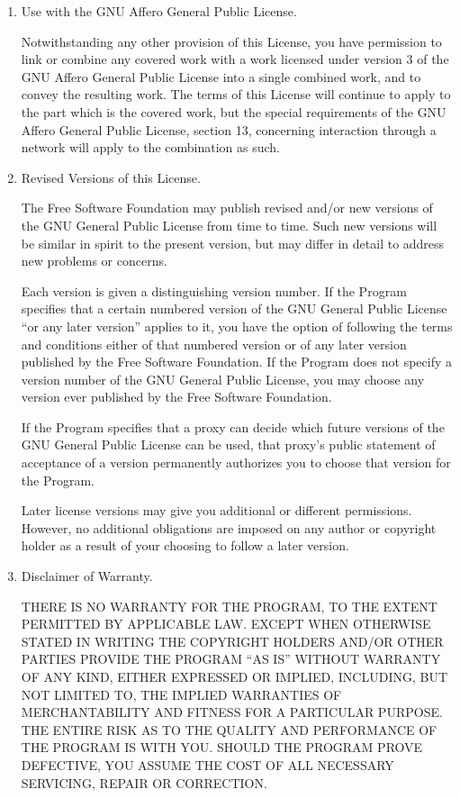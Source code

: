 \documentclass[11pt]{article}
\begin{document}
\begin{enumerate}
  \item Use with the GNU Affero General Public License.

        Notwithstanding any other provision of this License, you have
        permission to link or combine any covered work with a work licensed
        under version 3 of the GNU Affero General Public License into a single
        combined work, and to convey the resulting work.  The terms of this
        License will continue to apply to the part which is the covered work,
        but the special requirements of the GNU Affero General Public License,
        section 13, concerning interaction through a network will apply to the
        combination as such.

  \item Revised Versions of this License.

        The Free Software Foundation may publish revised and/or new versions of
        the GNU General Public License from time to time.  Such new versions will
        be similar in spirit to the present version, but may differ in detail to
        address new problems or concerns.

        Each version is given a distinguishing version number.  If the
        Program specifies that a certain numbered version of the GNU General
        Public License ``or any later version'' applies to it, you have the
        option of following the terms and conditions either of that numbered
        version or of any later version published by the Free Software
        Foundation.  If the Program does not specify a version number of the
        GNU General Public License, you may choose any version ever published
        by the Free Software Foundation.

        If the Program specifies that a proxy can decide which future
        versions of the GNU General Public License can be used, that proxy's
        public statement of acceptance of a version permanently authorizes you
        to choose that version for the Program.

        Later license versions may give you additional or different
        permissions.  However, no additional obligations are imposed on any
        author or copyright holder as a result of your choosing to follow a
        later version.

  \item Disclaimer of Warranty.

        \begin{sloppypar}
          THERE IS NO WARRANTY FOR THE PROGRAM, TO THE EXTENT PERMITTED BY
          APPLICABLE LAW.  EXCEPT WHEN OTHERWISE STATED IN WRITING THE
          COPYRIGHT HOLDERS AND/OR OTHER PARTIES PROVIDE THE PROGRAM ``AS IS''
          WITHOUT WARRANTY OF ANY KIND, EITHER EXPRESSED OR IMPLIED,
          INCLUDING, BUT NOT LIMITED TO, THE IMPLIED WARRANTIES OF
          MERCHANTABILITY AND FITNESS FOR A PARTICULAR PURPOSE.  THE ENTIRE
          RISK AS TO THE QUALITY AND PERFORMANCE OF THE PROGRAM IS WITH YOU.
          SHOULD THE PROGRAM PROVE DEFECTIVE, YOU ASSUME THE COST OF ALL
          NECESSARY SERVICING, REPAIR OR CORRECTION.
        \end{sloppypar}


\end{enumerate}
\end{document}
